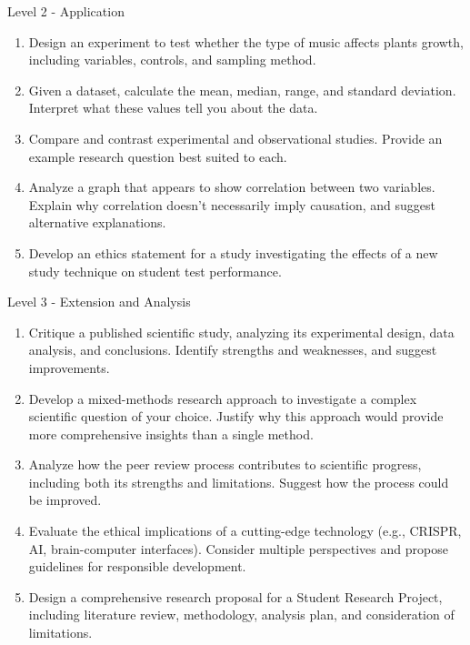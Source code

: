 \begin{tieredquestions}{Level 2 - Application}
\begin{enumerate}
    \item Design an experiment to test whether the type of music affects plants growth, including variables, controls, and sampling method.
    \item Given a dataset, calculate the mean, median, range, and standard deviation. Interpret what these values tell you about the data.
    \item Compare and contrast experimental and observational studies. Provide an example research question best suited to each.
    \item Analyze a graph that appears to show correlation between two variables. Explain why correlation doesn't necessarily imply causation, and suggest alternative explanations.
    \item Develop an ethics statement for a study investigating the effects of a new study technique on student test performance.
\end{enumerate}
\end{tieredquestions}

\begin{tieredquestions}{Level 3 - Extension and Analysis}
\begin{enumerate}
    \item Critique a published scientific study, analyzing its experimental design, data analysis, and conclusions. Identify strengths and weaknesses, and suggest improvements.
    \item Develop a mixed-methods research approach to investigate a complex scientific question of your choice. Justify why this approach would provide more comprehensive insights than a single method.
    \item Analyze how the peer review process contributes to scientific progress, including both its strengths and limitations. Suggest how the process could be improved.
    \item Evaluate the ethical implications of a cutting-edge technology (e.g., CRISPR, AI, brain-computer interfaces). Consider multiple perspectives and propose guidelines for responsible development.
    \item Design a comprehensive research proposal for a Student Research Project, including literature review, methodology, analysis plan, and consideration of limitations.
\end{enumerate}
\end{tieredquestions}

